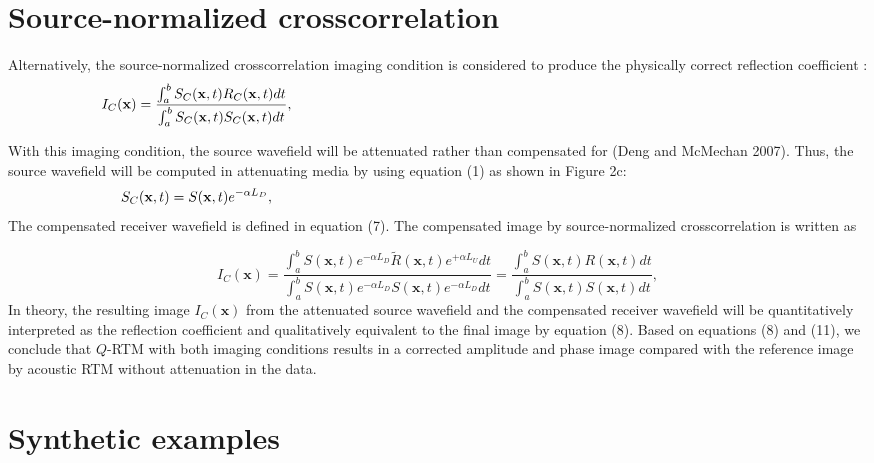 \section{Source-normalized crosscorrelation}

Alternatively, the source-normalized crosscorrelation imaging condition is considered to produce the physically correct reflection coefficient \citep{claerbout1971, chatt2008}:
\begin{equation}
\label{eq:eq9}                      
\hspace{0pt} I_{C}(\mathbf{x})=\frac{\int_{a}^{b} S_{C}(\mathbf{x},t) R_{C}(\mathbf{x},t) dt}{\int_{a}^{b} S_{C}(\mathbf{x},t) S_{C}(\mathbf{x},t) dt}, \hspace{\linewidth minus\linewidth}
\end{equation}

With this imaging condition, the source wavefield will be attenuated rather than compensated for (Deng and McMechan 2007). Thus, the source wavefield will be computed in attenuating media by using equation (1) as shown in Figure 2c:
\begin{equation}
\label{eq:eq10}                      
\hspace{0pt} S_{C}(\mathbf{x},t)=S(\mathbf{x},t) e^{-\alpha L_D},\hspace{\linewidth minus\linewidth}
\end{equation}
The compensated receiver wavefield is defined in equation (7). The compensated image by source-normalized crosscorrelation is written as

\begin{equation}
\label{eq:eq11}                      
I_{C}(\mathbf{x})=\frac{\int_{a}^{b} S(\mathbf{x},t) e^{-\alpha L_D} \tilde{R}(\mathbf{x},t) e^{+\alpha L_U} dt }{\int_{a}^{b} S(\mathbf{x},t)e^{-\alpha L_D} S(\mathbf{x},t) e^{-\alpha L_D} dt } = \frac{\int_{a}^{b} S(\mathbf{x},t)  R(\mathbf{x},t) dt }{\int_{a}^{b} S(\mathbf{x},t) S(\mathbf{x},t) dt },
\end{equation}
In theory, the resulting image $I_{C}(\mathbf{x})$ from the attenuated source wavefield and the compensated receiver wavefield will be quantitatively interpreted as the reflection coefficient and qualitatively equivalent to the final image by equation (8). 
Based on equations (8) and (11), we conclude that $Q$-RTM with both imaging conditions results in a corrected amplitude and phase image compared with the reference image by acoustic RTM without attenuation in the data.

\section{Synthetic examples}

